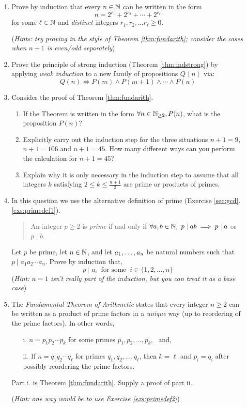 \begin{exercises}{}{}
\begin{enumerate}
		
		\item Prove by induction that every $n\in\mathbb{N}$ can be written in the form
	  \[
	    n=2^{r_1}+2^{r_2}+\cdots+2^{r_\ell}
	  \]
	  for some $\ell\in\mathbb{N}$ and \emph{distinct} integers $r_1,r_2,\ldots r_\ell \ge 0$.\par
	  (\emph{Hints: try proving in the style of Theorem \ref{thm:fundarith}; consider the cases when $n+1$ is even/odd separately})
	
	
		\item\label{exs:strongindproof} Prove the principle of strong induction (Theorem \ref{thm:indstrong}) by applying \emph{weak induction} to a new family of propositions $Q(n)$ via:
		\[
			Q(n)\iff P(m)\wedge P(m+1)\wedge\cdots\wedge P(n)
		\]
	
	
		\item Consider the proof of Theorem \ref{thm:fundarith}.
		\begin{enumerate}
	  	\item If the Theorem is written in the form $\forall n\in\mathbb{N}_{\ge 2}, P(n)$, what is the proposition $P(n)$?
	  	\item Explicitly carry out the induction step for the three situations $n+1=9$, $n+1=106$ and $n+1=45$. How many different ways can you perform the calculation for $n+1=45$? 
	  	\item Explain why it is only necessary in the induction step to assume that all integers $k$ satisfying $2\le k\le\frac{n+1}2$ are prime or products of primes.
		\end{enumerate}

		\item\label{exs:primedef2} In this question we use the alternative definition of prime (Exercise \ref*{sec:gcd}.\ref{exs:primedef1}).\footnotemark
		\begin{quote}
			An integer $p\ge 2$ is \emph{prime} if and only if $\forall a,b\in\mathbb{N},\ p\mid ab\implies p\mid a$ or $p\mid b$.
		\end{quote}
		Let $p$ be prime, let $n\in\mathbb{N}$, and let ${a}_1,\ldots,{a}_{n}$ be natural numbers such that $p\mid a_1a_2\cdots a_n$. Prove by induction that,
		\[
			p\mid a_i\ \text{ for some }\ i\in\{1,2,\ldots,n\}
		\]
	  (\emph{Hint: $n=1$ isn't really part of the induction, but you can treat it as a base case})
	  
	    
	  \item The \emph{Fundamental Theorem of Arithmetic} states that every integer $n\ge 2$ can be written as a product of prime factors in a \emph{unique} way (up to reordering of the prime factors). In other words, 
		\begin{itemize}
	    \item[i.] $n=p_1p_2\cdots p_k$ for some primes $p_1,p_2,\ldots,p_k$, \ and,
	    \item[ii.] If $n=q_1q_2\cdots q_\ell$ for primes $q_1,q_2,\ldots,q_\ell$, then $k=\ell$ and $p_i=q_i$ after possibly reordering the prime factors. 
		\end{itemize}
	  Part i.{} is Theorem \ref{thm:fundarith}. Supply a proof of part ii.\par
	  (\emph{Hint: one way would be to use Exercise \ref{exs:primedef2}})
		

\end{enumerate}
\end{exercises}
